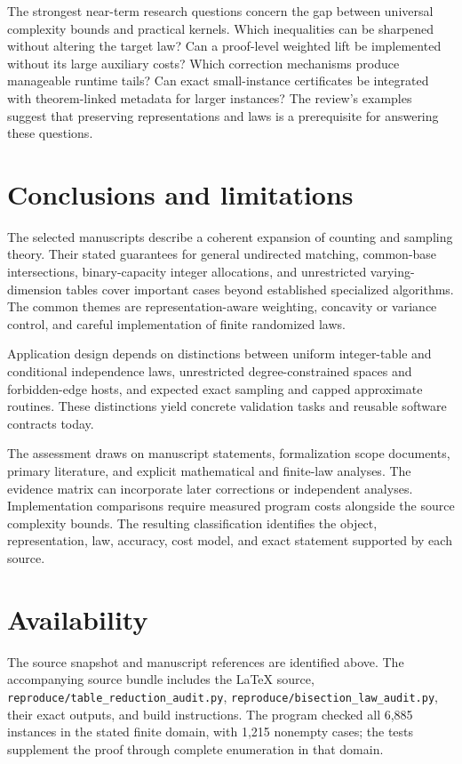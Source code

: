 \documentclass[11pt]{article}
\begin{document}
The strongest near-term research questions concern the gap between universal complexity bounds and practical kernels. Which inequalities can be sharpened without altering the target law? Can a proof-level weighted lift be implemented without its large auxiliary costs? Which correction mechanisms produce manageable runtime tails? Can exact small-instance certificates be integrated with theorem-linked metadata for larger instances? The review's examples suggest that preserving representations and laws is a prerequisite for answering these questions.

\section{Conclusions and limitations}
The selected manuscripts describe a coherent expansion of counting and sampling theory. Their stated guarantees for general undirected matching, common-base intersections, binary-capacity integer allocations, and unrestricted varying-dimension tables cover important cases beyond established specialized algorithms. The common themes are representation-aware weighting, concavity or variance control, and careful implementation of finite randomized laws.

Application design depends on distinctions between uniform integer-table and conditional independence laws, unrestricted degree-constrained spaces and forbidden-edge hosts, and expected exact sampling and capped approximate routines. These distinctions yield concrete validation tasks and reusable software contracts today.

The assessment draws on manuscript statements, formalization scope documents, primary literature, and explicit mathematical and finite-law analyses. The evidence matrix can incorporate later corrections or independent analyses. Implementation comparisons require measured program costs alongside the source complexity bounds. The resulting classification identifies the object, representation, law, accuracy, cost model, and exact statement supported by each source.

\section*{Availability}
The source snapshot and manuscript references are identified above. The accompanying source bundle includes the LaTeX source, \nolinkurl{reproduce/table_reduction_audit.py}, \nolinkurl{reproduce/bisection_law_audit.py}, their exact outputs, and build instructions. The program checked all 6,885 instances in the stated finite domain, with 1,215 nonempty cases; the tests supplement the proof through complete enumeration in that domain.
\end{document}
